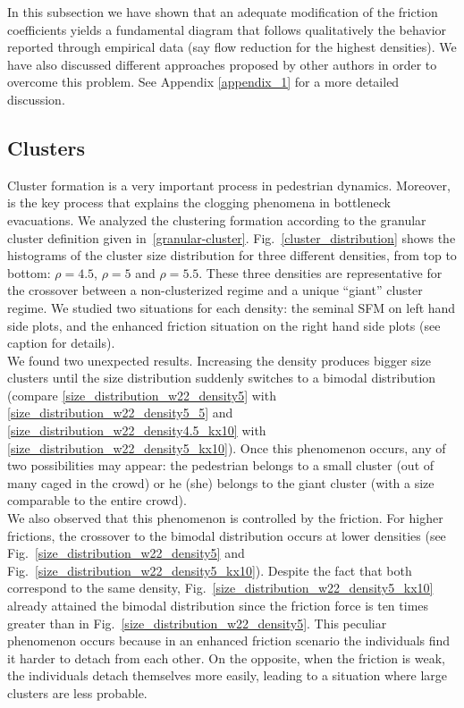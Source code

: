 In this subsection we have shown that an adequate modification of the friction coefficients yields a fundamental diagram that follows qualitatively the behavior reported through empirical data (say flow reduction for the highest densities). We have also discussed different approaches proposed by other authors in order to overcome this problem. See Appendix \ref{appendix_1} for a more detailed discussion.\\

\subsection{\label{clusters}Clusters}

Cluster formation is a very important process in pedestrian dynamics. Moreover, is the key process that explains the clogging phenomena in bottleneck evacuations. We analyzed the clustering formation according to the granular cluster definition given in~\ref{granular-cluster}. Fig.~\ref{cluster_distribution} shows the histograms of the cluster size distribution for three different densities, from top to bottom: $\rho=4.5$, $\rho=5$ and $\rho=5.5$. These three
densities are representative for the crossover between
a non-clusterized regime and a unique “giant” cluster
regime. We studied two situations for each density: the
seminal SFM on left hand side plots, and the enhanced
friction situation on the right hand side plots (see
caption for details).\\

We found two unexpected results. Increasing the density produces bigger size clusters until the size distribution suddenly switches to a bimodal distribution (compare \ref{size_distribution_w22_density5} with \ref{size_distribution_w22_density5_5} and \ref{size_distribution_w22_density4.5_kx10} with \ref{size_distribution_w22_density5_kx10}). Once
this phenomenon occurs, any of two possibilities may
appear: the pedestrian belongs to a small cluster (out
of many caged in the crowd) or he (she) belongs to the
giant cluster (with a size comparable to the entire crowd).\\

We also observed that this phenomenon is controlled by the friction. For higher frictions, the crossover to the bimodal distribution occurs at lower densities (see Fig.~\ref{size_distribution_w22_density5} and Fig.~\ref{size_distribution_w22_density5_kx10}). Despite the fact that both correspond to the same density, Fig.~\ref{size_distribution_w22_density5_kx10} already attained the bimodal distribution since the friction force is ten times greater than in Fig.~\ref{size_distribution_w22_density5}. This peculiar phenomenon
occurs because in an enhanced friction scenario the
individuals find it harder to detach from each other. On
the opposite, when the friction is weak, the individuals
detach themselves more easily, leading to a situation
where large clusters are less probable.\\

